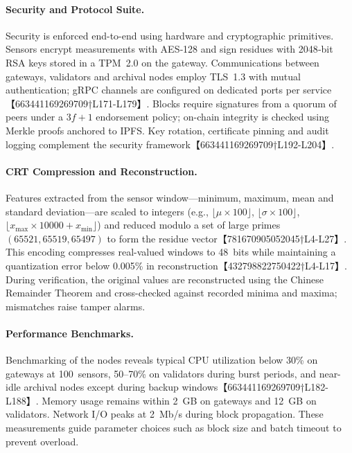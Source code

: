 \paragraph{Security and Protocol Suite.}  Security is enforced end-to-end using hardware and cryptographic primitives.  Sensors encrypt measurements with AES‑128 and sign residues with 2048‑bit RSA keys stored in a TPM~2.0 on the gateway.  Communications between gateways, validators and archival nodes employ TLS~1.3 with mutual authentication; gRPC channels are configured on dedicated ports per service【663441169269709†L171-L179】.  Blocks require signatures from a quorum of peers under a $3f+1$ endorsement policy; on-chain integrity is checked using Merkle proofs anchored to IPFS.  Key rotation, certificate pinning and audit logging complement the security framework【663441169269709†L192-L204】.

\paragraph{CRT Compression and Reconstruction.}  Features extracted from the sensor window—minimum, maximum, mean and standard deviation—are scaled to integers (e.g., $\lfloor\mu \times 100\rfloor$, $\lfloor\sigma \times 100\rfloor$, $\lfloor x_{\max}\times 10000 + x_{\min}\rfloor$) and reduced modulo a set of large primes $(65521,65519,65497)$ to form the residue vector【781670905052045†L4-L27】.  This encoding compresses real-valued windows to 48~bits while maintaining a quantization error below 0.005\% in reconstruction【432798822750422†L4-L17】.  During verification, the original values are reconstructed using the Chinese Remainder Theorem and cross-checked against recorded minima and maxima; mismatches raise tamper alarms.

\paragraph{Performance Benchmarks.}  Benchmarking of the nodes reveals typical CPU utilization below 30\% on gateways at 100~sensors, 50–70\% on validators during burst periods, and near-idle archival nodes except during backup windows【663441169269709†L182-L188】.  Memory usage remains within 2~GB on gateways and 12~GB on validators.  Network I/O peaks at 2~Mb/s during block propagation.  These measurements guide parameter choices such as block size and batch timeout to prevent overload.


